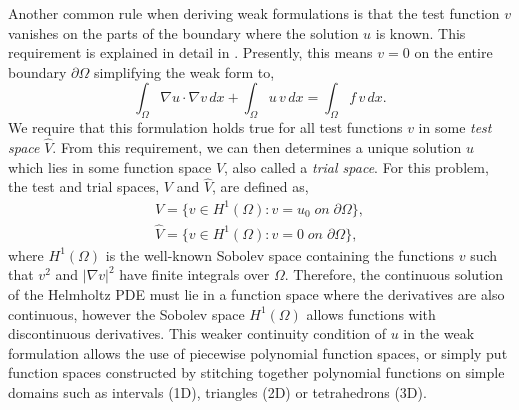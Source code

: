 \documentclass[]{article}
\theoremstyle{definition}
\begin{document}
Another common rule when deriving weak formulations is that the test function $v$ vanishes on the parts of the boundary where the solution $u$ is known.  This requirement is explained in detail in \cite{Langtangen2019}.  Presently, this means $v=0$ on the entire boundary $\partial \Omega$ simplifying the weak form to,
\begin{equation}
\int_{\Omega} \nabla u \cdot \nabla v \, dx + \int_{\Omega} u \, v \, dx = \int_{\Omega} f \, v \, dx.
\end{equation}
We require that this formulation holds true for all test functions $v$ in some \textit{test space} $\hat{V}$.  From this requirement, we can then determines a unique solution $u$ which lies in some function space $V$, also called a \textit{trial space}.  For this problem, the test and trial spaces, $V$ and $\hat{V}$, are defined as,
\begin{align}
V = \lbrace v \in H^1 (\Omega) : v=u_0 \; on \; \partial \Omega \rbrace, \\
\hat{V} = \lbrace v \in H^1 (\Omega) : v=0 \; on \; \partial \Omega \rbrace,
\end{align}
where $H^1 (\Omega)$ is the well-known Sobolev space containing the functions $v$ such that $v^2$ and $|\nabla v|^2$ have finite integrals over $\Omega$.  Therefore, the continuous solution of the Helmholtz PDE must lie in a function space where the derivatives are also continuous, however the Sobolev space $H^1 (\Omega)$ allows functions with discontinuous derivatives.  This weaker continuity condition of $u$ in the weak formulation allows the use of piecewise polynomial function spaces, or simply put function spaces constructed by stitching together polynomial functions on simple domains such as intervals (1D), triangles (2D) or tetrahedrons (3D). 
\end{document}
